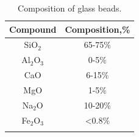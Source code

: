 \begin{table}
\caption{Composition of glass beads.}
\centering
\begin{tabular}{c c}
\hline
Compound & Composition,\%\\
\hline
SiO$_2$ & 65-75\% \\
Al$_2$O$_3$ & 0-5\%\\
CaO & 6-15\% \\
MgO & 1-5\%\\
Na$_2$O & 10-20\%\\
Fe$_2$O$_3$ & \textless 0.8\%\\
\hline
\label{bead_composition}
\end{tabular}
\end{table}